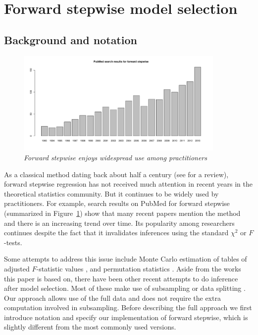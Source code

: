 \documentclass{imsart}
\begin{document}
\section{Forward stepwise model selection}
\label{sec:stepwise}

\subsection{Background and notation}

\begin{figure}
\begin{center}
\includegraphics[width=0.9\textwidth]{../figs/pubmed.pdf}
\caption{\small \it Forward stepwise enjoys widespread use among
practitioners}
\label{fig:pubmed}
\end{center}
\end{figure}


As a classical method dating back about half a century
(see \cite{classical:selection} for a review),
forward stepwise regression has not received much attention in
recent years in the theoretical statistics community. But it continues
to be widely used by practitioners.
For example, search results on PubMed for forward stepwise
(summarized in Figure~\ref{fig:pubmed}) show that many recent
papers mention the method and there is an increasing trend over time.
Its popularity among researchers continues despite the fact that it
invalidates inferences using the standard $\chi^2$ or $F$-tests.


Some attempts to address this issue include Monte Carlo
estimation of tables of adjusted $F$-statistic values \citep{mc:ftoenter},
and permutation statistics \citep{permutation:stop}. Aside from the works
this paper is based on, there have been other recent attempts to do
inference after model selection. Most of these make use of subsampling
\citep{meinshausen:buhlmann} or data splitting \citep{wasserman:roeder}.
Our approach allows use of the full data and does not require the
extra computation involved in subsampling.
Before describing the full approach we first introduce notation and
specify our implementation of forward stepwise, which is slightly
different from the most commonly used versions.
\end{document}
